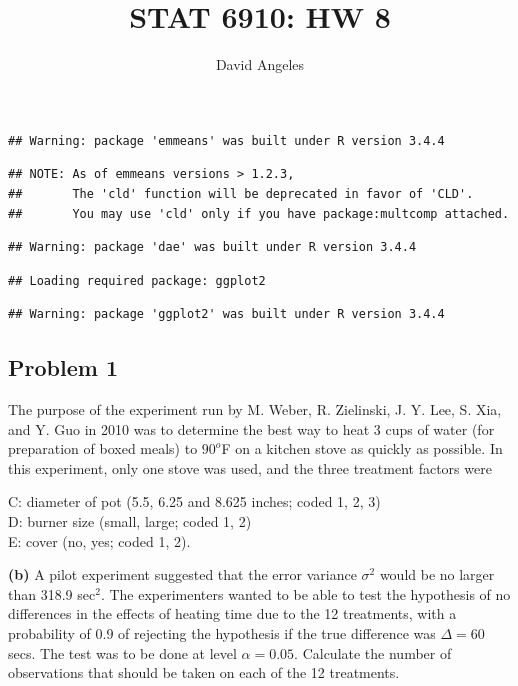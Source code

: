 \documentclass[12pt,]{article}
\title{STAT 6910: HW 8}
\author{David Angeles}
\date{}
\begin{document}
\maketitle

\begin{verbatim}
## Warning: package 'emmeans' was built under R version 3.4.4
\end{verbatim}

\begin{verbatim}
## NOTE: As of emmeans versions > 1.2.3,
##       The 'cld' function will be deprecated in favor of 'CLD'.
##       You may use 'cld' only if you have package:multcomp attached.
\end{verbatim}

\begin{verbatim}
## Warning: package 'dae' was built under R version 3.4.4
\end{verbatim}

\begin{verbatim}
## Loading required package: ggplot2
\end{verbatim}

\begin{verbatim}
## Warning: package 'ggplot2' was built under R version 3.4.4
\end{verbatim}

\subsection{Problem 1}\label{problem-1}

The purpose of the experiment run by M. Weber, R. Zielinski, J. Y. Lee,
S. Xia, and Y. Guo in 2010 was to determine the best way to heat 3 cups
of water (for preparation of boxed meals) to \(90^o\)F on a kitchen
stove as quickly as possible. In this experiment, only one stove was
used, and the three treatment factors were

\begin{center}
C: diameter of pot (5.5, 6.25 and 8.625 inches; coded 1, 2, 3)\\
D: burner size (small, large; coded 1, 2)\\
E: cover (no, yes; coded 1, 2).
\end{center}

\textbf{(b)} A pilot experiment suggested that the error variance
\(\sigma^2\) would be no larger than 318.9 sec\(^2\). The experimenters
wanted to be able to test the hypothesis of no differences in the
effects of heating time due to the 12 treatments, with a probability of
0.9 of rejecting the hypothesis if the true difference was
\(\Delta= 60\) secs. The test was to be done at level \(\alpha = 0.05\).
Calculate the number of observations that should be taken on each of the
12 treatments.
\end{document}
